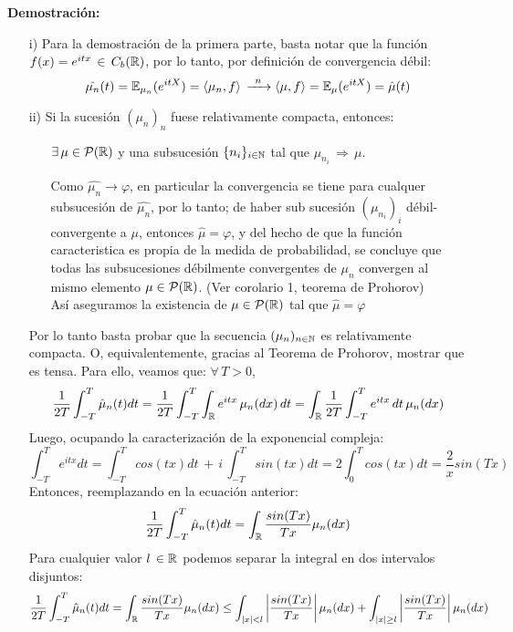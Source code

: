 \textbf{Demostración:} \begin{itemize}
    \item[i)] Para la demostración de la primera parte, basta notar que la función $f(x) = e^{itx}\,\in\,C_b(\mathbb R)$, por lo tanto, por definición de convergencia débil:
    \[\hat{\mu_n}(t) = \mathbb E_{\mu_n}(e^{itX}) = \langle \mu_n , f\rangle\,\xrightarrow{\,\,\,n\,\,\,}\langle \mu, f \rangle = \mathbb E_{\mu}(e^{itX}) = \hat{\mu}(t)\]
    
    \item[ii)] Si la sucesión $(\mu_n)_n$ fuese relativamente compacta, entonces:
    \begin{itemize}
        \item[\cdot] $\exists\,\mu\in\mathcal{P}(\mathbb R)$ y una subsucesión $\{n_i\}_{i \in \mathbb N}$ tal que $\mu_{n_i}\,\Rightarrow\,\mu$.
        \item[\cdot] Como $\hat{\mu_n}\rightarrow\varphi$, en particular la convergencia se tiene para cualquer subsucesión de $\hat{\mu_n}$, por lo tanto; de haber sub sucesión $(\mu_{n_i})_{i}$ débil-convergente a $\mu$, entonces $\hat{\mu} = \varphi$, y del hecho de que la función caracteristica es propia de la medida de probabilidad, se concluye que todas las subsucesiones débilmente convergentes de $\mu_n$ convergen al mismo elemento $\mu\in\mathcal{P}(\mathbb R)$. (Ver corolario 1, teorema de Prohorov)\\ \newline
        Así aseguramos la existencia de $\mu \in \mathcal{P}(\mathbb R)$ tal que $\hat{\mu} = \varphi$ 
    \end{itemize}
    Por lo tanto basta probar que la secuencia $(\mu_n)_{n\in\mathbb N}$ es relativamente compacta. O, equivalentemente, gracias al Teorema de Prohorov, mostrar que es tensa. Para ello, veamos que: $\forall\,T>0$,
    \[\frac{1}{2T}\int_{-T}^{T}\hat{\mu}_n(t)dt = \frac{1}{2T}\int_{-T}^{T}\int_{\mathbb R}e^{itx}\,\mu_n(dx)\,dt = \int_{\mathbb R}\frac{1}{2T}\int_{-T}^{T} e^{itx}\,dt\,\mu_n(dx) \]
    Luego, ocupando la caracterización de la exponencial compleja:
    \[\int_{-T}^{T}e^{itx}dt = \int_{-T}^{T}cos(tx)dt\,+\,i\,\int_{-T}^T sin(tx)dt = 2\int_{0}^{T}cos(tx)dt = \frac{2}{x}sin(Tx)\]
    Entonces, reemplazando en la ecuación anterior:
    \[\frac{1}{2T}\int_{-T}^{T}\hat{\mu}_n(t)dt = \int_{\mathbb R}\frac{sin(Tx)}{Tx}\mu_n(dx)\]
    Para cualquier valor $l\,\in\mathbb R$ podemos separar la integral en dos intervalos disjuntos:
    \[\frac{1}{2T}\int_{-T}^{T}\hat{\mu}_n(t)dt = \int_{\mathbb R}\frac{sin(Tx)}{Tx}\mu_n(dx) \leq \int_{|x|<l}\left|\frac{sin(Tx)}{Tx}\right| \mu_n(dx) + \int_{|x|\geq l}\left|\frac{sin(Tx)}{Tx}\right|\mu_n(dx)\]

\end{itemize}
